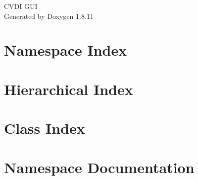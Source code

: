 \documentclass[twoside]{book}
\newcommand{\+}{\discretionary{\mbox{\scriptsize$\hookleftarrow$}}{}{}}
\newcommand{\clearemptydoublepage}{%
  \newpage{\pagestyle{empty}\cleardoublepage}%
}
\begin{document}
\hypersetup{pageanchor=false,
             bookmarksnumbered=true,
             pdfencoding=unicode
            }
\begin{titlepage}
\vspace*{7cm}
\begin{center}%
{\Large C\+V\+DI G\+UI }\\
\vspace*{1cm}
{\large Generated by Doxygen 1.8.11}\\
\end{center}
\end{titlepage}
\clearemptydoublepage
\tableofcontents
\clearemptydoublepage
{}
\hypersetup{pageanchor=true}

\chapter{Namespace Index}

\chapter{Hierarchical Index}

\chapter{Class Index}

\chapter{Namespace Documentation}







\end{document}
